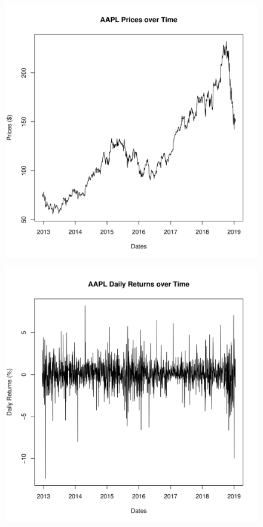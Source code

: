 \documentclass[11pt, letterpaper]{article}
\begin{document}
\begin{file}[q6.r i)]
	
\end{file}

\begin{figure}[h!]
	\centering
	\includegraphics[scale=0.55]{code/q6-1.png}
\end{figure}

\begin{figure}[h!]
	\centering
	\includegraphics[scale=0.55]{code/q6-2.png}
\end{figure}
\newpage
\end{document}
